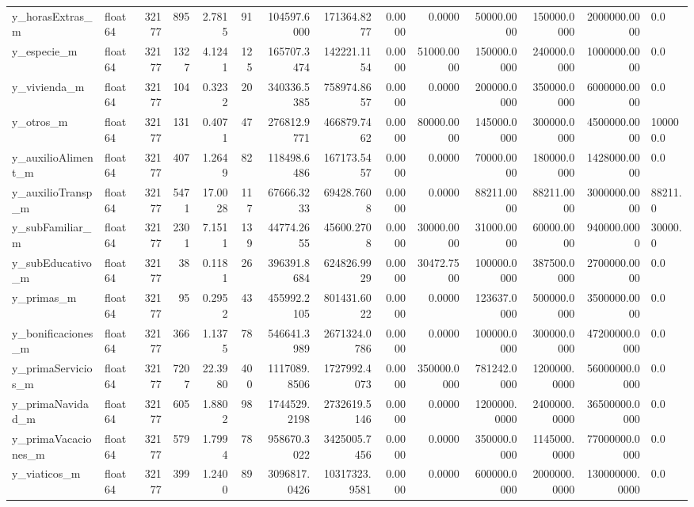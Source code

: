 \begin{longtable}{llrrrrrrrrrrrl}
y\_horasExtras\_m & float64 & 32177 & 895 & 2.7815 & 91 & 104597.6000 & 171364.8277 & 0.0000 & 0.0000 & 50000.0000 & 150000.0000 & 2000000.0000 & 0.0 \\
y\_especie\_m & float64 & 32177 & 1327 & 4.1241 & 125 & 165707.3474 & 142221.1154 & 0.0000 & 51000.0000 & 150000.0000 & 240000.0000 & 1000000.0000 & 0.0 \\
y\_vivienda\_m & float64 & 32177 & 104 & 0.3232 & 20 & 340336.5385 & 758974.8657 & 0.0000 & 0.0000 & 200000.0000 & 350000.0000 & 6000000.0000 & 0.0 \\
y\_otros\_m & float64 & 32177 & 131 & 0.4071 & 47 & 276812.9771 & 466879.7462 & 0.0000 & 80000.0000 & 145000.0000 & 300000.0000 & 4500000.0000 & 100000.0 \\
y\_auxilioAliment\_m & float64 & 32177 & 407 & 1.2649 & 82 & 118498.6486 & 167173.5457 & 0.0000 & 0.0000 & 70000.0000 & 180000.0000 & 1428000.0000 & 0.0 \\
y\_auxilioTransp\_m & float64 & 32177 & 5471 & 17.0028 & 117 & 67666.3233 & 69428.7608 & 0.0000 & 0.0000 & 88211.0000 & 88211.0000 & 3000000.0000 & 88211.0 \\
y\_subFamiliar\_m & float64 & 32177 & 2301 & 7.1511 & 139 & 44774.2655 & 45600.2708 & 0.0000 & 30000.0000 & 31000.0000 & 60000.0000 & 940000.0000 & 30000.0 \\
y\_subEducativo\_m & float64 & 32177 & 38 & 0.1181 & 26 & 396391.8684 & 624826.9929 & 0.0000 & 30472.7500 & 100000.0000 & 387500.0000 & 2700000.0000 & 0.0 \\
y\_primas\_m & float64 & 32177 & 95 & 0.2952 & 43 & 455992.2105 & 801431.6022 & 0.0000 & 0.0000 & 123637.0000 & 500000.0000 & 3500000.0000 & 0.0 \\
y\_bonificaciones\_m & float64 & 32177 & 366 & 1.1375 & 78 & 546641.3989 & 2671324.0786 & 0.0000 & 0.0000 & 100000.0000 & 300000.0000 & 47200000.0000 & 0.0 \\
y\_primaServicios\_m & float64 & 32177 & 7207 & 22.3980 & 400 & 1117089.8506 & 1727992.4073 & 0.0000 & 350000.0000 & 781242.0000 & 1200000.0000 & 56000000.0000 & 0.0 \\
y\_primaNavidad\_m & float64 & 32177 & 605 & 1.8802 & 98 & 1744529.2198 & 2732619.5146 & 0.0000 & 0.0000 & 1200000.0000 & 2400000.0000 & 36500000.0000 & 0.0 \\
y\_primaVacaciones\_m & float64 & 32177 & 579 & 1.7994 & 78 & 958670.3022 & 3425005.7456 & 0.0000 & 0.0000 & 350000.0000 & 1145000.0000 & 77000000.0000 & 0.0 \\
y\_viaticos\_m & float64 & 32177 & 399 & 1.2400 & 89 & 3096817.0426 & 10317323.9581 & 0.0000 & 0.0000 & 600000.0000 & 2000000.0000 & 130000000.0000 & 0.0 \\

\end{longtable}
